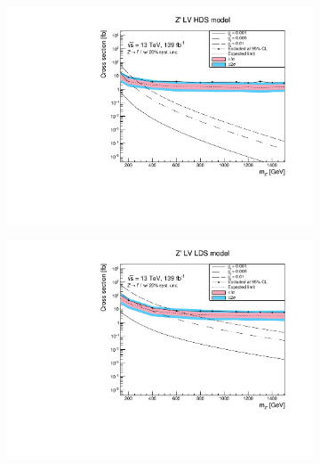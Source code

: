 \documentclass[14pt, a4paper]{book}
\begin{document}
\begin{figure}[!ht]
   \hfill
   \begin{subfigure}[b]{0.49\textwidth}
      \centering
      \includegraphics[width=1\textwidth]{Limits/LV_HDS/mass_exclusion_comb.pdf}
   \end{subfigure}
   \hfill
   \begin{subfigure}[b]{0.49\textwidth}
      \centering
      \includegraphics[width=1\textwidth]{Limits/LV_LDS/mass_exclusion_comb.pdf}
   \end{subfigure}
   \hfill
	\begin{subfigure}[b]{0.49\textwidth}
      \centering

\end{subfigure}
\end{figure}
\end{document}
